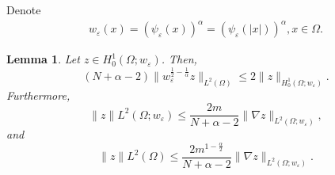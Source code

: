 \documentclass[11pt]{article}
\newtheorem{lemma}{Lemma}[section]
\numberwithin{equation}{section}
\def\e{\varepsilon}
\def\Om{\Omega}
\def\al{\alpha}
\begin{document}
Denote
\begin{equation*}
\begin{split}
w_\e(x) = (\psi_\e(x))^\al = (\psi_\e(|x|))^\al,   x \in \Om.
\end{split}
\end{equation*}
\begin{lemma}\label{08.16.L2}
Let $z \in H_0^1(\Om; w_\e)$. Then,
\begin{equation}\label{08.20.1}
(N + \al - 2)\|w_\e^{\frac{1}{2} - \frac{1}{\al}}z\|_{L^2(\Om)} \leq 2\|z\|_{H_0^1(\Om; w_\e)}.
\end{equation}
Furthermore,
\begin{equation}\label{08.20.2}
\|z\|{L^2(\Om; w_\e)} \leq \frac{2m}{N + \al - 2}\|\nabla z\|_{L^2(\Om; w_\e)},
\end{equation}
and
\begin{equation}\label{08.31.10}
\|z\|{L^2(\Om)} \leq \frac{2m^{1 - \frac{\al}{2}}}{N + \al - 2}\|\nabla z\|_{L^2(\Om; w_\e)}.
\end{equation}
\end{lemma}
\end{document}
